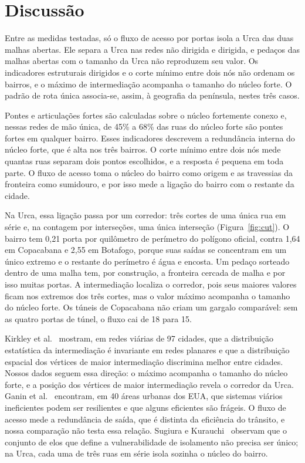 \section{Discussão}
\label{sec:discussion}

Entre as medidas testadas, só o fluxo de acesso por portas isola a Urca
das duas malhas abertas. Ele separa a Urca nas redes não dirigida e
dirigida, e pedaços das malhas abertas com o tamanho da Urca não
reproduzem seu valor. Os indicadores estruturais dirigidos e o corte
mínimo entre dois nós não ordenam os bairros, e o máximo de intermediação
acompanha o tamanho do núcleo forte. O padrão de rota única associa-se, assim,
à geografia da península, nestes três casos.

Pontes e articulações fortes são calculadas sobre o núcleo fortemente
conexo e, nessas redes de mão única, de 45\% a 68\% das ruas do núcleo
forte são pontes fortes em qualquer bairro. Esses indicadores descrevem a
redundância interna do
núcleo forte, que é alta nos três bairros. O corte
mínimo entre dois nós mede quantas ruas separam dois pontos escolhidos, e
a resposta é pequena em toda parte. O fluxo de acesso toma o núcleo do bairro como
origem e as travessias da fronteira como sumidouro, e por isso mede a
ligação do bairro com o restante da cidade.

Na Urca, essa ligação passa por um corredor: três cortes de uma única rua
em série e, na contagem por interseções, uma única interseção
(Figura~\ref{fig:cut}). O bairro tem 0,21 porta por quilômetro de
perímetro do polígono oficial, contra 1,64 em Copacabana e 2,55 em
Botafogo, porque suas saídas se concentram em um único extremo e o
restante do perímetro é água e encosta. Um pedaço sorteado dentro de uma
malha tem, por construção, a fronteira cercada de malha e por isso muitas
portas. A intermediação localiza o corredor, pois seus maiores valores
ficam nos extremos dos três cortes, mas o valor máximo acompanha o
tamanho do núcleo forte. Os túneis de Copacabana não criam um gargalo
comparável: sem as quatro portas de túnel, o fluxo cai de 18 para 15.

Kirkley et al.~\cite{kirkley2018betweenness} mostram, em redes viárias de
97 cidades, que a distribuição estatística da intermediação é invariante
em redes planares e que a distribuição espacial dos vértices de maior
intermediação discrimina melhor entre cidades. Nossos dados seguem essa
direção: o máximo acompanha o tamanho do núcleo forte, e a posição dos vértices
de maior intermediação revela o corredor da Urca. Ganin et
al.~\cite{ganin2017resilience} encontram, em 40 áreas urbanas dos EUA,
que sistemas viários ineficientes podem ser resilientes e que alguns
eficientes são frágeis. O fluxo de acesso mede a redundância de saída,
que é distinta da eficiência do trânsito, e nossa comparação não testa
essa relação. Sugiura e Kurauchi~\cite{sugiura2023isolation} observam que
o conjunto de elos que define a vulnerabilidade de isolamento não precisa
ser único; na Urca, cada uma de três ruas em série isola sozinha
o núcleo do bairro.

